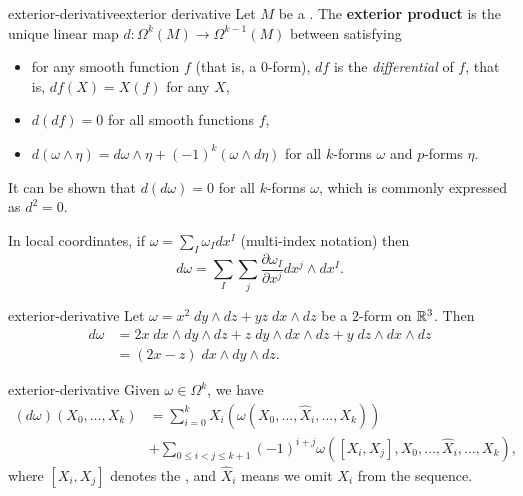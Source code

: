 \begin{topic}{exterior-derivative}{exterior derivative}
    Let $M$ be a . The \textbf{exterior product} is the unique linear map $d \colon \Omega^k(M) \to \Omega^{k - 1}(M)$ between  satisfying
    \begin{itemize}
        \item for any smooth function $f$ (that is, a $0$-form), $df$ is the \textit{differential} of $f$, that is, $df(X) = X(f)$ for any  $X$,
        \item $d(df) = 0$ for all smooth functions $f$,
        \item $d(\omega \wedge \eta) = d \omega \wedge \eta + (-1)^k (\omega \wedge d\eta)$ for all $k$-forms $\omega$ and $p$-forms $\eta$.
    \end{itemize}
    It can be shown that $d(d\omega) = 0$ for all $k$-forms $\omega$, which is commonly expressed as $d^2 = 0$.
    
    In local coordinates, if $\omega = \sum_I \omega_I dx^I$ (multi-index notation) then
    \[ d \omega = \sum_I \sum_j \frac{\partial \omega_I}{\partial x^j} dx^j \wedge dx^I . \]
\end{topic}

\begin{example}{exterior-derivative}
    Let $\omega = x^2 \; dy \wedge dz + yz \; dx \wedge dz$ be a $2$-form on $\mathbb{R}^3$. Then
    \[ \begin{aligned}
        d\omega
            &= 2x \; dx \wedge dy \wedge dz + z \; dy \wedge dx \wedge dz + y \; dz \wedge dx \wedge dz \\
            &= (2x - z) \; dx \wedge dy \wedge dz .
    \end{aligned} \]
\end{example}

\begin{example}{exterior-derivative}
    Given $\omega \in \Omega^k$, we have
    \[ \begin{aligned} (d\omega)(X_0, \ldots, X_k) &= \sum_{i = 0}^{k} X_i\left( \omega\left(X_0, \ldots, \widehat{X}_i, \ldots, X_k \right) \right) \\ &+ \sum_{0 \le i < j \le k + 1} (-1)^{i + j} \omega\left([X_i, X_j], X_0, \ldots, \widehat{X}_i, \ldots, X_k \right) , \end{aligned} \]
    where $[X_i, X_j]$ denotes the , and $\hat{X}_i$ means we omit $X_i$ from the sequence.
\end{example}


